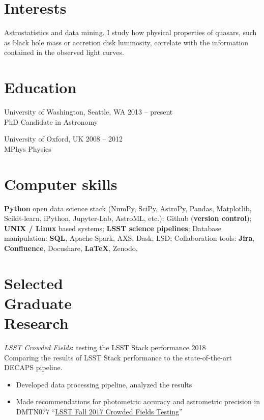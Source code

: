 \documentclass[margin]{res}
\begin{document}
\begin{resume}

\section{Interests} Astrostatistics and data mining. I study how physical properties of quasars, such as black hole mass or accretion disk luminosity, correlate with the information contained in the observed light curves.



\section{Education} 
University of Washington, Seattle, WA \hfill 2013 -- present\\
PhD Candidate in Astronomy

University of Oxford, UK \hfill 2008 -- 2012\\
MPhys Physics  

\section{Computer skills}
\textbf{Python} open data science stack (NumPy, SciPy, AstroPy, Pandas, Matplotlib, Scikit-learn, iPython, Jupyter-Lab, AstroML, etc.); 
Github (\textbf{version control});
\textbf{UNIX / Linux} based systems;
\textbf{LSST science pipelines}; 
Database manipulation: \textbf{SQL}, Apache-Spark, AXS, Dask, LSD; 
Collaboration tools: \textbf{Jira}, \textbf{Confluence}, Docushare, \textbf{LaTeX}, Zenodo.


\section{Selected \\Graduate \\Research} 
{\sl LSST Crowded Fields}:  testing the LSST Stack performance  \hfill          2018\\
Comparing the results of LSST Stack performance to the state-of-the-art DECAPS pipeline. 
\begin{itemize}  \itemsep -2pt %
\item Developed data processing pipeline, analyzed the results 
\item Made recommendations for photometric accuracy and astrometric precision in DMTN077 ``\href{https://dmtn-077.lsst.io}{LSST Fall 2017 Crowded Fields Testing}''
\end{itemize}  


\end{resume}
\end{document}
